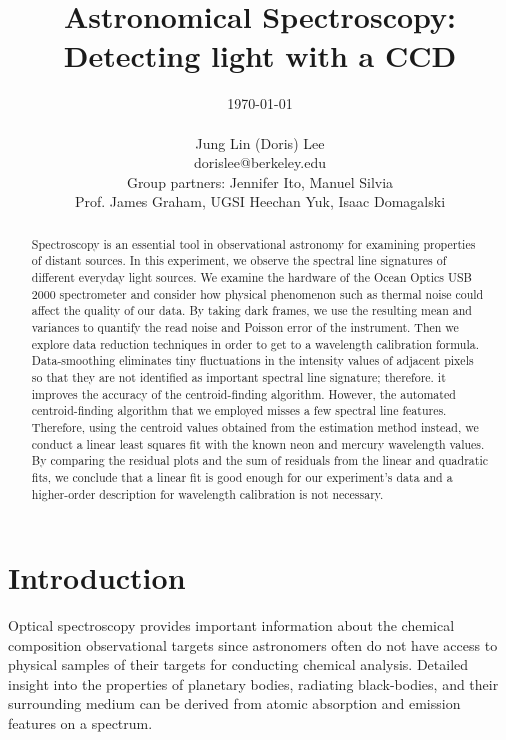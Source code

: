 \documentclass[authoryear, 12pt,5p, times]{elsarticle}
\begin{document}
\begin{frontmatter}
\title{Astronomical Spectroscopy: Detecting light with a CCD}
\author{\today \\ \quad \\Jung Lin (Doris) Lee\\ dorislee@berkeley.edu\\Group partners: Jennifer Ito, Manuel Silvia\\Prof. James Graham, UGSI Heechan Yuk, Isaac Domagalski}
	\begin{abstract}
	Spectroscopy is an essential tool in observational astronomy for examining  properties of distant sources. In this experiment, we observe the spectral line signatures of different everyday light sources. We examine the hardware of the Ocean Optics USB 2000 spectrometer and consider how physical phenomenon such as thermal noise could affect the quality of our data. %
By taking dark frames, we use the resulting mean and variances to
  quantify the read noise and Poisson error of the instrument. 	Then we explore data reduction techniques in order to get to a wavelength calibration formula. Data-smoothing eliminates tiny fluctuations in the intensity values of adjacent pixels so that they are not identified as important spectral line signature; therefore. it improves the accuracy of the centroid-finding algorithm. However, the automated centroid-finding algorithm that we employed misses a few spectral line features. Therefore, using the centroid values obtained from the estimation method instead, we conduct a linear least squares fit with the known neon and mercury wavelength values. By comparing the residual plots and the sum of residuals from the linear and quadratic fits, we conclude that a linear fit is good enough for our experiment's data and a higher-order description for wavelength calibration is not necessary. 
  
	\end{abstract}
\end{frontmatter}
\section{Introduction\label{intro}}
Optical spectroscopy provides important information about the chemical composition observational targets since astronomers often do not have access to physical samples of their targets for conducting chemical analysis. Detailed insight into the properties of planetary bodies, radiating black-bodies, and their  surrounding medium can be derived from atomic absorption and emission features on a spectrum.
\end{document}
